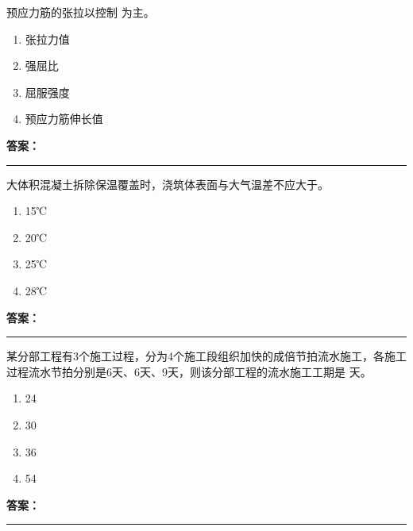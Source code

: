 \documentclass[UTF8,fontset=fandol,11pt]{ctexart}
\newcommand{\answerline}{\textcolor{answerred}{\rule{2.4cm}{0.7pt}}}
\begin{document}
\begin{quizbox}[title={乱序第 66 题｜第五章预应力混凝土工程}]

预应力筋的张拉以控制 为主。\\

\begin{enumerate}[label=\Alph*.]

\item 张拉力值

\item 强屈比

\item 屈服强度

\item 预应力筋伸长值

\end{enumerate}

\textbf{\textcolor{answerred}{答案：}} \answerline

\end{quizbox}

\vspace{0.2em}

\begin{quizbox}[title={乱序第 67 题｜第四章混凝土结构工程}]

大体积混凝土拆除保温覆盖时，浇筑体表面与大气温差不应大于。\\

\begin{enumerate}[label=\Alph*.]

\item 15℃

\item 20℃

\item 25℃

\item 28℃

\end{enumerate}

\textbf{\textcolor{answerred}{答案：}} \answerline

\end{quizbox}

\vspace{0.2em}

\begin{quizbox}[title={乱序第 68 题｜第十章流水施工原理}]

某分部工程有3个施工过程，分为4个施工段组织加快的成倍节拍流水施工，各施工过程流水节拍分别是6天、6天、9天，则该分部工程的流水施工工期是 天。\\

\begin{enumerate}[label=\Alph*.]

\item 24

\item 30

\item 36

\item 54

\end{enumerate}

\textbf{\textcolor{answerred}{答案：}} \answerline

\end{quizbox}
\end{document}
